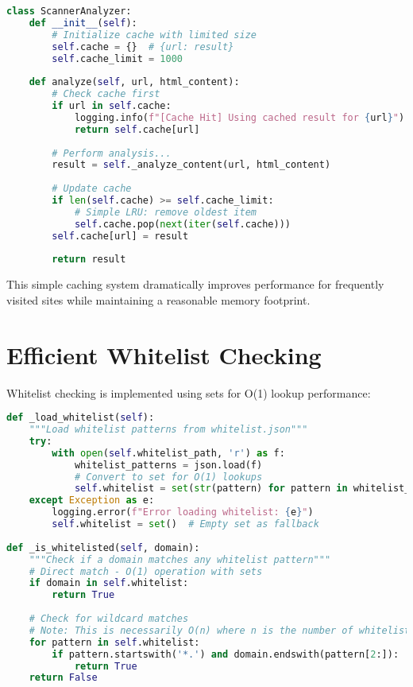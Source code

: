 \begin{lstlisting}[language=Python, caption=Scan Result Caching]
class ScannerAnalyzer:
    def __init__(self):
        # Initialize cache with limited size
        self.cache = {}  # {url: result}
        self.cache_limit = 1000
        
    def analyze(self, url, html_content):
        # Check cache first
        if url in self.cache:
            logging.info(f"[Cache Hit] Using cached result for {url}")
            return self.cache[url]
            
        # Perform analysis...
        result = self._analyze_content(url, html_content)
        
        # Update cache
        if len(self.cache) >= self.cache_limit:
            # Simple LRU: remove oldest item
            self.cache.pop(next(iter(self.cache)))
        self.cache[url] = result
        
        return result
\end{lstlisting}

This simple caching system dramatically improves performance for frequently visited sites while maintaining a reasonable memory footprint.

\section{Efficient Whitelist Checking}

Whitelist checking is implemented using sets for O(1) lookup performance:

\begin{lstlisting}[language=Python, caption=Efficient Whitelist Checking]
def _load_whitelist(self):
    """Load whitelist patterns from whitelist.json"""
    try:
        with open(self.whitelist_path, 'r') as f:
            whitelist_patterns = json.load(f)
            # Convert to set for O(1) lookups
            self.whitelist = set(str(pattern) for pattern in whitelist_patterns)
    except Exception as e:
        logging.error(f"Error loading whitelist: {e}")
        self.whitelist = set()  # Empty set as fallback
        
def _is_whitelisted(self, domain):
    """Check if a domain matches any whitelist pattern"""
    # Direct match - O(1) operation with sets
    if domain in self.whitelist:
        return True
        
    # Check for wildcard matches
    # Note: This is necessarily O(n) where n is the number of whitelist entries
    for pattern in self.whitelist:
        if pattern.startswith('*.') and domain.endswith(pattern[2:]):
            return True
    return False
\end{lstlisting}

